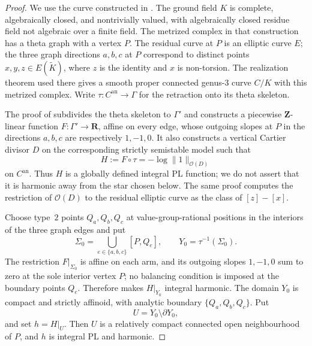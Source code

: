 \begin{proof}
We use the curve constructed in \cite[\S17]{GJR26}.  The ground field $K$ is
complete, algebraically closed, and nontrivially valued, with algebraically
closed residue field not algebraic over a finite field.  The metrized complex
in that construction has a theta graph with a vertex $P$.  The residual
curve at $P$ is an elliptic curve $E$; the three graph directions $a,b,c$ at
$P$ correspond to distinct points $x,y,z\in E(\widetilde K)$, where $z$ is
the identity and $x$ is non-torsion.  The realization theorem used there
gives a smooth proper connected genus-$3$ curve $C/K$ with this metrized
complex.  Write $\tau:C^{\mathrm{an}}\to\Gamma$ for the retraction onto its
theta skeleton.

The proof of \cite[Proposition~17.4]{GJR26} subdivides the theta skeleton to
$\Gamma'$ and constructs a piecewise $\mathbf Z$-linear function
$F:\Gamma'\to\mathbf R$, affine on every edge, whose outgoing slopes at $P$
in the directions $a,b,c$ are respectively $1,-1,0$.  It also constructs a
vertical Cartier divisor $D$ on the corresponding strictly semistable model
such that
\[
                         H:=F\circ\tau=-\log\lVert1\rVert_{\mathcal O(D)}
\]
on $C^{\mathrm{an}}$.  Thus $H$ is a globally defined integral PL function;
we do not assert that it is harmonic away from the star chosen below.  The
same proof computes the restriction of $\mathcal O(D)$ to the residual
elliptic curve as the class of $[z]-[x]$.

Choose type~$2$ points $Q_a,Q_b,Q_c$ at value-group-rational positions in the
interiors of the three graph edges and put
\[
              \Sigma_0=\bigcup_{e\in\{a,b,c\}}[P,Q_e],
              \qquad Y_0=\tau^{-1}(\Sigma_0).
\]
The restriction $F|_{\Sigma_0}$ is affine on each arm, and its outgoing
slopes $1,-1,0$ sum to zero at the sole interior vertex $P$; no balancing
condition is imposed at the boundary points $Q_e$.  Therefore
\cite[Proposition~15.9]{GJR26} makes $H|_{Y_0}$ integral harmonic.  The
domain $Y_0$ is compact and strictly affinoid, with analytic boundary
$\{Q_a,Q_b,Q_c\}$.  Put
\begin{equation}
\label{eq:ch19-harmonic-reg-open-star}
                         U=Y_0\setminus\partial Y_0,
\end{equation}
and set $h=H|_U$.  Then $U$ is a relatively compact connected open
neighbourhood of $P$, and $h$ is integral PL and harmonic.


\end{proof}
